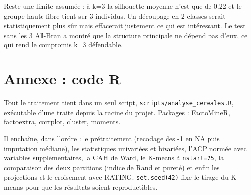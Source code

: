 \documentclass[11pt,a4paper]{article}
\begin{document}
Reste une limite assumée : à k=3 la silhouette moyenne n'est que de 0.22 et le groupe haute fibre tient sur 3 individus. Un découpage en 2 classes serait statistiquement plus sûr mais effacerait justement ce qui est intéressant. Le test sans les 3 All-Bran a montré que la structure principale ne dépend pas d'eux, ce qui rend le compromis k=3 défendable.

\newpage
\section{Annexe : code R}

Tout le traitement tient dans un seul script, \texttt{scripts/analyse\_cereales.R}, exécutable d'une traite depuis la racine du projet. Packages : FactoMineR, factoextra, corrplot, cluster, moments.

Il enchaîne, dans l'ordre : le prétraitement (recodage des -1 en NA puis imputation médiane), les statistiques univariées et bivariées, l'ACP normée avec variables supplémentaires, la CAH de Ward, le K-means à \texttt{nstart=25}, la comparaison des deux partitions (indice de Rand et pureté) et enfin les projections et le croisement avec RATING. \texttt{set.seed(42)} fixe le tirage du K-means pour que les résultats soient reproductibles.

{\small}
\end{document}
